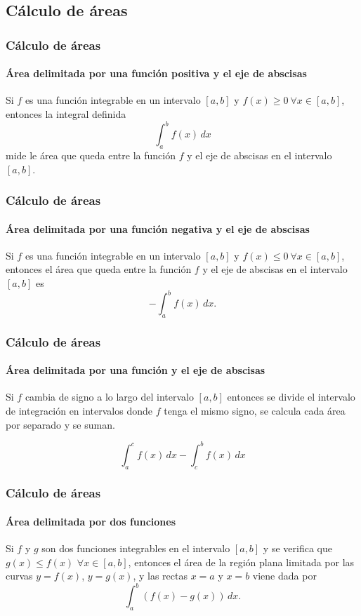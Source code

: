 \subsection{Cálculo de áreas}
\begin{frame}
\frametitle{Cálculo de áreas}
\framesubtitle{Área delimitada por una función positiva y el eje de abscisas}
Si $f$ es una función integrable en un intervalo $[a,b]$ y $f(x)\geq 0\ \forall x\in[a,b]$, entonces la integral definida
\[\int_a^b f(x)\,dx\]
mide le área que queda entre la función $f$ y el eje de abscisas en el intervalo $[a,b]$.
\begin{center}
\scalebox{1}{}
\end{center}
\end{frame}


\begin{frame}
\frametitle{Cálculo de áreas}
\framesubtitle{Área delimitada por una función negativa y el eje de abscisas}
Si $f$ es una función integrable en un intervalo $[a,b]$ y $f(x)\leq 0\ \forall x\in[a,b]$, entonces el área que queda entre la función $f$ y el eje de abscisas en el intervalo $[a,b]$ es
\[
-\int_a^b f(x)\,dx.
\]
\begin{center}
\scalebox{1}{}
\end{center}
\end{frame}


\begin{frame}
\frametitle{Cálculo de áreas}
\framesubtitle{Área delimitada por una función y el eje de abscisas}
Si $f$ cambia de signo a lo largo del intervalo $[a,b]$ entonces se divide el intervalo de integración en intervalos donde $f$ tenga el mismo signo, se calcula cada área por separado y se suman.
\begin{center}
\scalebox{1}{}
\end{center}
\[\int_a^c f(x)\,dx -\int_c^b f(x)\,dx\]
\end{frame}


\begin{frame}
\frametitle{Cálculo de áreas}
\framesubtitle{Área delimitada por dos funciones}
Si $f$ y $g$ son dos funciones integrables en el intervalo $[a,b]$ y se
verifica que $g(x)\leq f(x)$ $\forall x\in[a,b]$, entonces el área de la región
plana limitada por las curvas $y=f(x)$, $y=g(x)$, y las rectas $x=a$ y $x=b$
viene dada por
\[
\int_{a}^{b}{(f(x)- g(x))\,dx}.
\]

\begin{center}
\scalebox{1}{}
\end{center}
\end{frame}
